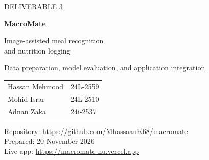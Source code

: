 \documentclass[11pt,a4paper]{article}
\begin{document}
\hypersetup{pageanchor=false}
\begin{titlepage}
\vspace*{20mm}
{\color{macrogreen}\large DELIVERABLE 3\par}
\vspace{8mm}
{\Huge\bfseries MacroMate\par}
\vspace{4mm}
{\LARGE Image-assisted meal recognition\\and nutrition logging\par}
\vspace{12mm}
{\large Data preparation, model evaluation, and application integration\par}
\vspace{16mm}
\begin{tabular}{ll}
Hassan Mehmood & 24L-2559\\
Mohid Israr & 24L-2510\\
Adnan Zaka & 24i-2537
\end{tabular}
\vfill
Repository: \url{https://github.com/MhassaanK68/macromate}\\
Prepared: 20 November 2026\\
Live app: \url{https://macromate-nu.vercel.app}
\end{titlepage}
\hypersetup{pageanchor=true}

\begin{abstract}
MacroMate combines an eight-class food recognizer with a manually confirmed,
reference-based nutrition workflow. The collection contains 400 photographs,
balanced at 50 per dish, with a group-aware 280/64/56 train/validation/test split.
A partially fine-tuned CLIP ViT-B/32 updates the last two vision blocks, final
vision normalization, and visual projection while retaining frozen text features.
The recorded experiment selected epoch 6 from 11 epochs and classified 54 of 56
held-out photos correctly (96.43\%); top-three accuracy was 56/56 and macro F1
was 0.9641. These are historical experimental results, not accuracy measurements
of arbitrary user uploads. The new Python application validates uploaded images,
shows ranked suggestions, requires explicit dish confirmation, scales nutrition
by user-entered grams, and supports a temporary daily log with CSV export.
Model assets are provisioned with integrity checks. Software validation and
deployment status are reported separately from model evaluation. The small,
source-confounded test set, unsupported unfamiliar foods, recipe proxies, and
temporary storage limit practical use.
\end{abstract}
\begingroup\small\tableofcontents\endgroup
\clearpage
{}
\end{document}
